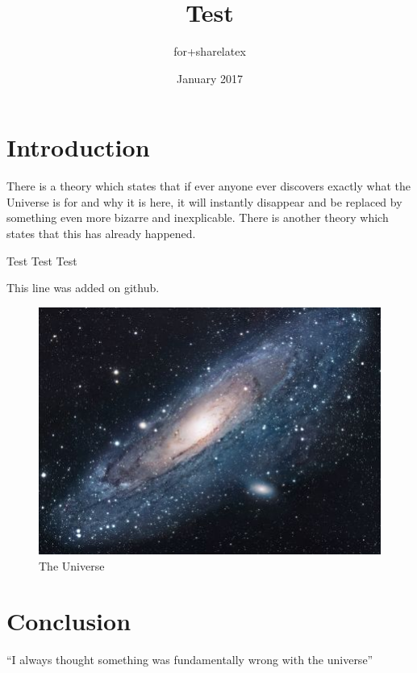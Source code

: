 \documentclass{article}
\title{Test}
\author{for+sharelatex }
\date{January 2017}
\begin{document}
\maketitle

\section{Introduction}
There is a theory which states that if ever anyone ever discovers exactly what the Universe is for and why it is here, it will instantly disappear and be replaced by something even more bizarre and inexplicable.
There is another theory which states that this has already happened.

Test Test Test \cite{adams1995hitchhiker, authorA, }

This line was added on github.

\begin{figure}[h!]
\centering
\includegraphics[scale=1.7]{universe.jpg}
\caption{The Universe}
\label{fig:univerise}
\end{figure}

\section{Conclusion}
``I always thought something was fundamentally wrong with the universe'' \citep{adams1995hitchhiker}



\end{document}
